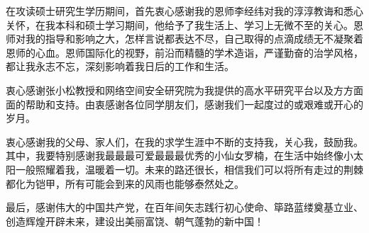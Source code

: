 在攻读硕士研究生学历期间，首先衷心感谢我的恩师李经纬对我的淳淳教诲和悉心关怀，在我本科和硕士学习期间，他给予了我生活上、学习上无微不至的关心。恩师对我的指导和影响之大，怎样言说都表达不尽，自己取得的点滴成绩无不凝聚着恩师的心血。恩师国际化的视野，前沿而精髓的学术造诣，严谨勤奋的治学风格，都让我永志不忘，深刻影响着我日后的工作和生活。

衷心感谢张小松教授和网络空间安全研究院为我提供的高水平研究平台以及方方面面的帮助和支持。由衷感谢各位同学朋友们，感谢我们一起度过的或艰难或开心的岁月。

衷心感谢我的父母、家人们，在我的求学生涯中不断的支持我，关心我，鼓励我。其中，我要特别感谢我最最最可爱最最最优秀的小仙女罗楠，在生活中始终像小太阳一般照耀着我，温暖着一切。未来的路还很长，相信我们可以将所有走过的荆棘都化为铠甲，所有可能会到来的风雨也能够泰然处之。

最后，感谢伟大的中国共产党，在百年间矢志践行初心使命、筚路蓝缕奠基立业、创造辉煌开辟未来，建设出美丽富饶、朝气蓬勃的新中国！